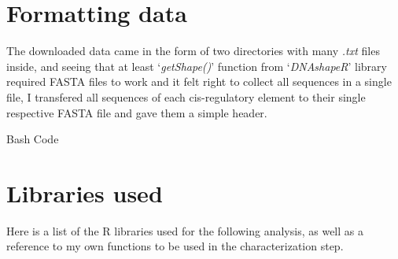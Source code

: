 \documentclass[
  letterpaper,
]{article}
\newenvironment{Shaded}{\begin{snugshade}}{\end{snugshade}}
\newcommand{\BuiltInTok}[1]{\textcolor[rgb]{0.00,0.23,0.31}{#1}}
\newcommand{\DataTypeTok}[1]{\textcolor[rgb]{0.68,0.00,0.00}{#1}}
\newcommand{\FunctionTok}[1]{\textcolor[rgb]{0.28,0.35,0.67}{#1}}
\newcommand{\NormalTok}[1]{\textcolor[rgb]{0.00,0.23,0.31}{#1}}
\newcommand{\OperatorTok}[1]{\textcolor[rgb]{0.37,0.37,0.37}{#1}}
\newcommand{\PreprocessorTok}[1]{\textcolor[rgb]{0.68,0.00,0.00}{#1}}
\newcommand{\StringTok}[1]{\textcolor[rgb]{0.13,0.47,0.30}{#1}}
\begin{document}
\newpage

\section{Formatting data}\label{formatting-data}

The downloaded data came in the form of two directories with many
\emph{.txt} files inside, and seeing that at least `\emph{getShape()}'
function from `\emph{DNAshapeR}' library required FASTA files to work
and it felt right to collect all sequences in a single file, I
transfered all sequences of each cis-regulatory element to their single
respective FASTA file and gave them a simple header.

\begin{bashheader}
Bash Code
\end{bashheader}
\vspace{-1.75pt}

\begin{Shaded}
\end{Shaded}

\section{Libraries used}\label{libraries-used}

Here is a list of the R libraries used for the following analysis, as
well as a reference to my own functions to be used in the
characterization step.
\end{document}
